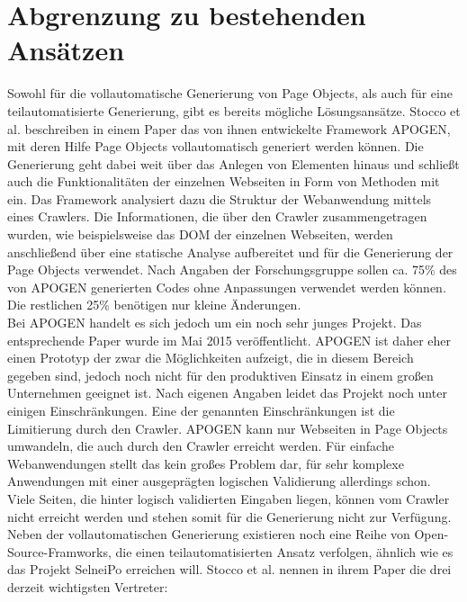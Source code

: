 \section{Abgrenzung zu bestehenden Ansätzen}
\label{sec:abgrenzung_zu_bestehenden_ansaetzen}
Sowohl für die vollautomatische Generierung von Page Objects, als auch für eine teilautomatisierte Generierung, gibt es bereits mögliche Lösungsansätze. 
Stocco et al. \cite{stocco_why_2015} beschreiben in einem Paper das von ihnen entwickelte Framework APOGEN, mit deren Hilfe Page Objects vollautomatisch generiert werden können. Die Generierung geht dabei weit über das Anlegen von Elementen hinaus und schließt auch die Funktionalitäten der einzelnen Webseiten in Form von Methoden mit ein.
Das Framework analysiert dazu die Struktur der Webanwendung mittels eines Crawlers. Die Informationen, die über den Crawler zusammengetragen wurden, wie beispielsweise das DOM der einzelnen Webseiten, werden anschließend über eine statische Analyse aufbereitet und für die Generierung der Page Objects verwendet.
Nach Angaben der Forschungsgruppe sollen ca. 75\% des von APOGEN generierten Codes ohne Anpassungen verwendet werden können. Die restlichen 25\% benötigen nur kleine Änderungen.\\
Bei APOGEN handelt es sich jedoch um ein noch sehr junges Projekt. Das entsprechende Paper wurde im Mai 2015 veröffentlicht. APOGEN ist daher eher einen Prototyp der zwar die Möglichkeiten aufzeigt, die in diesem Bereich gegeben sind, jedoch noch nicht für den produktiven Einsatz in einem großen Unternehmen geeignet ist.
Nach eigenen Angaben leidet das Projekt noch unter einigen Einschränkungen. Eine der genannten Einschränkungen ist die Limitierung durch den Crawler.
APOGEN kann nur Webseiten in Page Objects umwandeln, die auch durch den Crawler erreicht werden.
Für einfache Webanwendungen stellt das kein großes Problem dar, für sehr komplexe Anwendungen mit einer ausgeprägten logischen Validierung allerdings schon.
Viele Seiten, die hinter logisch validierten Eingaben liegen, können vom Crawler nicht erreicht werden und stehen somit für die Generierung nicht zur Verfügung.\\
Neben der vollautomatischen Generierung existieren noch eine Reihe von Open-Source-Framworks,
die einen teilautomatisierten Ansatz verfolgen, ähnlich wie es das Projekt SelneiPo erreichen will.
Stocco et al. \cite{stocco_why_2015} nennen in ihrem Paper die drei derzeit wichtigsten Vertreter:

